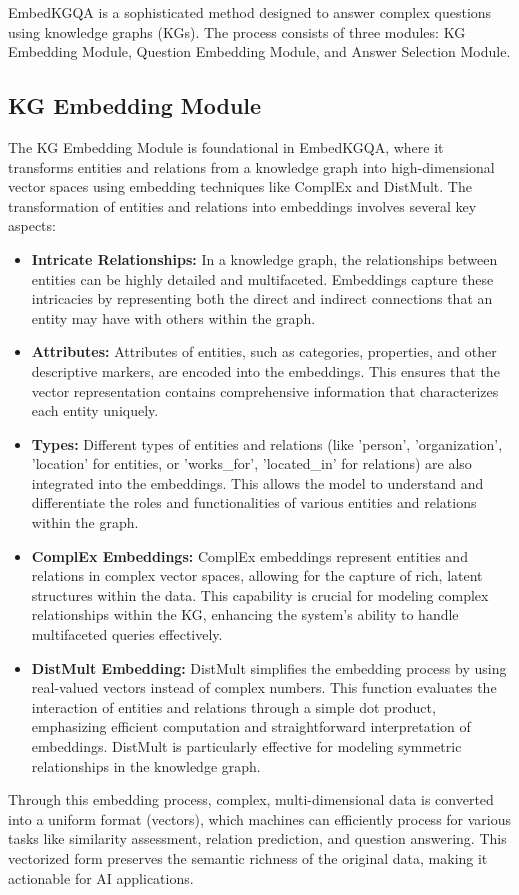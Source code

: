\documentclass[12pt]{article}
\begin{document}
EmbedKGQA is a sophisticated method designed to answer complex questions using knowledge graphs (KGs). The process consists of three modules: KG Embedding Module, Question Embedding Module, and Answer Selection Module.

\subsection{KG Embedding Module}
The KG Embedding Module is foundational in EmbedKGQA, where it transforms entities and relations from a knowledge graph into high-dimensional vector spaces using embedding techniques like ComplEx and DistMult. The transformation of entities and relations into embeddings involves several key aspects:
\begin{itemize}
    \item \textbf{Intricate Relationships:} In a knowledge graph, the relationships between entities can be highly detailed and multifaceted. Embeddings capture these intricacies by representing both the direct and indirect connections that an entity may have with others within the graph.

    \item \textbf{Attributes:} Attributes of entities, such as categories, properties, and other descriptive markers, are encoded into the embeddings. This ensures that the vector representation contains comprehensive information that characterizes each entity uniquely.
    \item \textbf{Types:} Different types of entities and relations (like 'person', 'organization', 'location' for entities, or 'works\_for', 'located\_in' for relations) are also integrated into the embeddings. This allows the model to understand and differentiate the roles and functionalities of various entities and relations within the graph.
    \item \textbf{ComplEx Embeddings:} ComplEx embeddings represent entities and relations in complex vector spaces, allowing for the capture of rich, latent structures within the data. This capability is crucial for modeling complex relationships within the KG, enhancing the system's ability to handle multifaceted queries effectively.
    \item \textbf{DistMult Embedding:} DistMult simplifies the embedding process by using real-valued vectors instead of complex numbers. This function evaluates the interaction of entities and relations through a simple dot product, emphasizing efficient computation and straightforward interpretation of embeddings. DistMult is particularly effective for modeling symmetric relationships in the knowledge graph.
\end{itemize}
Through this embedding process, complex, multi-dimensional data is converted into a uniform format (vectors), which machines can efficiently process for various tasks like similarity assessment, relation prediction, and question answering. This vectorized form preserves the semantic richness of the original data, making it actionable for AI applications.
\end{document}
